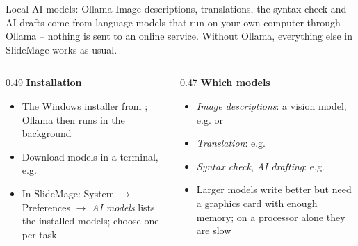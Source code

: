 
\begin{standardframe}{Local AI models: Ollama}
	\small
	Image descriptions, translations, the syntax check and AI drafts come from
	language models that run on your own computer through Ollama -- nothing is
	sent to an online service. Without Ollama, everything else in SlideMage
	works as usual.
	\par\medskip
	\begin{columns}[T,onlytextwidth]
		\begin{column}{0.49\linewidth}
			\textbf{Installation}
			\begin{itemize}
				\item The Windows installer from ; Ollama then runs in the background
				\item Download models in a terminal, e.g. 
				\item In SlideMage: System $\rightarrow$ Preferences $\rightarrow$ \emph{AI models} lists the installed models; choose one per task
			\end{itemize}
		\end{column}
		\begin{column}{0.47\linewidth}
			\textbf{Which models}
			\begin{itemize}
				\item \emph{Image descriptions}: a vision model, e.g.  or 
				\item \emph{Translation}: e.g. 
				\item \emph{Syntax check}, \emph{AI drafting}: e.g. 
				\item Larger models write better but need a graphics card with enough memory; on a processor alone they are slow
			\end{itemize}
		\end{column}
	\end{columns}
\end{standardframe}
